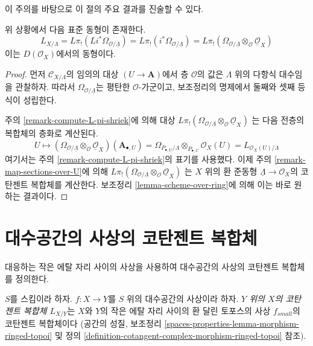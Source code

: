 \noindent
이 주의를 바탕으로 이 절의 주요 결과를 진술할 수 있다.

\begin{lemma}
\label{lemma-cotangent-morphism-schemes}
위 상황에서 다음 표준 동형이 존재한다.
$$
L_{X/\Lambda} = 
L\pi_!(Li^*\Omega_{\mathcal{O}/\underline{\Lambda}}) =
L\pi_!(i^*\Omega_{\mathcal{O}/\underline{\Lambda}}) =
L\pi_!(\Omega_{\mathcal{O}/\underline{\Lambda}}
\otimes_\mathcal{O} \underline{\mathcal{O}}_X)
$$
이는 $D(\mathcal{O}_X)$에서의 동형이다.
\end{lemma}

\begin{proof}
먼저 $\mathcal{C}_{X/\Lambda}$의 임의의 대상 $(U \to \mathbf{A})$에서
층 $\mathcal{O}$의 값은 $\Lambda$ 위의 다항식 대수임을 관찰하자.
따라서 $\Omega_{\mathcal{O}/\underline{\Lambda}}$는 평탄한
$\mathcal{O}$-가군이고, 보조정리의 명제에서 둘째와 셋째 등식이 성립한다.

\medskip\noindent
주의 \ref{remark-compute-L-pi-shriek}에 의해 대상
$L\pi_!(\Omega_{\mathcal{O}/\underline{\Lambda}}
\otimes_\mathcal{O} \underline{\mathcal{O}}_X)$
는 다음 전층의 복합체의 층화로 계산된다.
$$
U \mapsto
\left(\Omega_{\mathcal{O}/\underline{\Lambda}}
\otimes_\mathcal{O} \underline{\mathcal{O}}_X\right)(\mathbf{A}_{\bullet, U})
=
\Omega_{P_{\bullet, U}/\Lambda} \otimes_{P_{\bullet, U}} \mathcal{O}_X(U) =
L_{\mathcal{O}_X(U)/\Lambda}
$$
여기서는 주의 \ref{remark-compute-L-pi-shriek}의 표기를 사용했다.
이제 주의 \ref{remark-map-sections-over-U}에 의해
$L\pi_!(\Omega_{\mathcal{O}/\underline{\Lambda}}
\otimes_\mathcal{O} \underline{\mathcal{O}}_X)$
는 $X$ 위의 환 준동형 $\underline{\Lambda} \to \mathcal{O}_X$의
코탄젠트 복합체를 계산한다. 보조정리 \ref{lemma-scheme-over-ring}에 의해
이는 바로 원하는 결과이다.
\end{proof}








\section{대수공간의 사상의 코탄젠트 복합체}
\label{section-cotangent-morphism-spaces}

\noindent
대응하는 작은 에탈 자리 사이의 사상을 사용하여
대수공간의 사상의 코탄젠트 복합체를 정의한다.

\begin{definition}
\label{definition-cotangent-morphism-spaces}
$S$를 스킴이라 하자. $f : X \to Y$를 $S$ 위의 대수공간의 사상이라 하자.
{\it $Y$ 위의 $X$의 코탄젠트 복합체 $L_{X/Y}$}는 $X$와 $Y$의 작은
에탈 자리 사이의 환 달린 토포스의 사상 $f_{small}$의 코탄젠트 복합체이다
(공간의 성질, 보조정리
\ref{spaces-properties-lemma-morphism-ringed-topoi}
및 정의 \ref{definition-cotangent-complex-morphism-ringed-topoi} 참조).
\end{definition}

